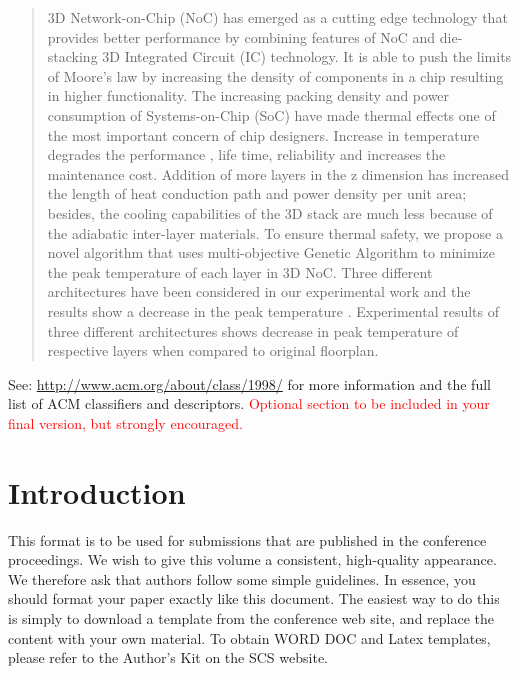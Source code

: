 \documentclass{scsPaperFormattingTemplate-LaTex-Revised20160302}
\begin{document}
\begin{abstract}
3D Network-on-Chip (NoC) has emerged as a cutting edge technology that provides better performance by combining features of NoC and die-stacking 3D Integrated Circuit (IC) technology. It is able to push the limits of Moore’s law by increasing the density of components in a chip resulting in higher functionality. The increasing packing density and power consumption of Systems-on-Chip (SoC) have made thermal effects one of the most important concern of chip designers. Increase in temperature degrades the performance
, life time, reliability and increases the maintenance cost. Addition of more layers in the z dimension has increased the length of heat conduction path and power density per unit area; besides, the cooling capabilities of the 3D stack are much less because of the adiabatic inter-layer materials. To ensure thermal safety, we propose a novel algorithm that uses multi-objective Genetic Algorithm to minimize the peak temperature of each layer in 3D NoC. Three different architectures have been considered in our experimental work
and the results show a decrease in the peak temperature . Experimental results of three different architectures shows decrease in peak temperature of respective layers when compared to original floorplan.
\end{abstract}


See: \url{http://www.acm.org/about/class/1998/} for more information and the full list of ACM classifiers and descriptors.
\textcolor{red}{Optional section to be included in your final version, but strongly encouraged.}

\section{Introduction}

This format is to be used for submissions that are published in the conference proceedings. We wish to give this volume a consistent, high-quality appearance. We therefore ask that authors follow some simple guidelines. In essence, you should format your paper exactly like this document. The easiest way to do this is simply to download a template from the conference web site, and replace the content with your own material. To obtain WORD DOC and Latex templates, please refer to the Author’s Kit on the SCS website.
\end{document}
